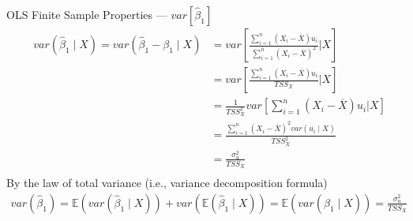\documentclass[notes,10pt, aspectratio=169]{beamer}
\begin{document}
\begin{frame}{OLS Finite Sample Properties --- $var[\hat{\beta}_1]$}
\begin{eqnarray*}
& var(\hat{\beta}_1 \mid X) =  var(\hat{\beta}_1 - \beta_1 \mid X) &= var\left[\frac{\sum_{i=1}^n (X_i - \overline{X})u_i}{\sum_{i=1}^n (X_i - \overline{X})^2}\Bigg|X\right]\\
& &= var\left[\frac{\sum_{i=1}^n (X_i - \overline{X})u_i}{TSS_X}\Bigg|X\right]\\
& &= \frac{1}{TSS_X^2}var\left[\sum_{i=1}^n (X_i - \overline{X})u_i\bigg|X\right]\\
& &= \frac{\sum_{i=1}^n (X_i - \overline{X})^2 var(u_i\mid X)}{TSS_X^2}\\
& &= \frac{\sigma^2_u}{TSS_X}\\
\end{eqnarray*}
By the law of total variance (i.e., variance decomposition formula)
\begin{eqnarray*}
     var(\hat{\beta}_1) = \mathbb{E}(var(\hat{\beta}_1 \mid X))+var(\mathbb{E}(\hat{\beta}_1 \mid X)) =  \mathbb{E}(var(\hat{\beta}_1 \mid X)) =   \frac{\sigma^2_u}{TSS_X}
\end{eqnarray*}
\end{frame}

\end{document}

